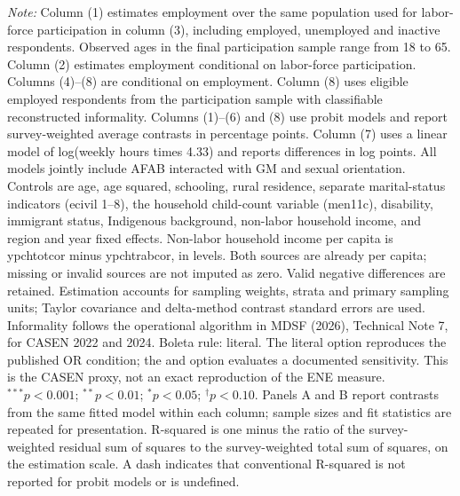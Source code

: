 \begin{table}[htpb!]
\begin{minipage}{\textwidth}
\textit{Note:} Column (1) estimates employment over the same population used for labor-force participation in column (3), including employed, unemployed and inactive respondents. Observed ages in the final participation sample range from 18 to 65. Column (2) estimates employment conditional on labor-force participation. Columns (4)--(8) are conditional on employment.  Column (8) uses eligible employed respondents from the participation sample with classifiable reconstructed informality. Columns (1)--(6) and (8) use probit models and report survey-weighted average contrasts in percentage points. Column (7) uses a linear model of log(weekly hours times 4.33) and reports differences in log points. All models jointly include AFAB interacted with GM and sexual orientation. Controls are age, age squared, schooling, rural residence, separate marital-status indicators (ecivil 1--8), the household child-count variable (men11c), disability, immigrant status, Indigenous background, non-labor household income, and region and year fixed effects. Non-labor household income per capita is ypchtotcor minus ypchtrabcor, in levels. Both sources are already per capita; missing or invalid sources are not imputed as zero. Valid negative differences are retained. Estimation accounts for sampling weights, strata and primary sampling units; Taylor covariance and delta-method contrast standard errors are used. Informality follows the operational algorithm in MDSF (2026), Technical Note 7, for CASEN 2022 and 2024. Boleta rule: literal. The literal option reproduces the published OR condition; the and option evaluates a documented sensitivity. This is the CASEN proxy, not an exact reproduction of the ENE measure. $^{***}p<0.001$; $^{**}p<0.01$; $^{*}p<0.05$; $^{\dagger}p<0.10$. Panels A and B report contrasts from the same fitted model within each column; sample sizes and fit statistics are repeated for presentation. R-squared is one minus the ratio of the survey-weighted residual sum of squares to the survey-weighted total sum of squares, on the estimation scale. A dash indicates that conventional R-squared is not reported for probit models or is undefined.
\end{minipage}
\end{table}
